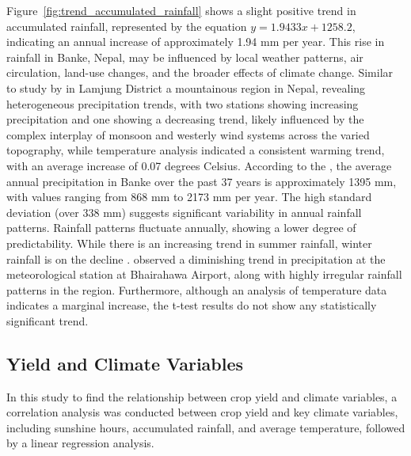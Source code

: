 Figure~\ref{fig:trend_accumulated_rainfall} shows a slight positive trend in accumulated rainfall, represented by the equation $y=1.9433x + 1258.2$, indicating an annual increase of approximately 1.94 mm per year. This rise in rainfall in Banke, Nepal, may be influenced by local weather patterns, air circulation, land-use changes, and the broader effects of climate change. Similar to study by \parencite{poudelRelationshipsClimateVariability2016} in Lamjung District a mountainous region in Nepal, revealing heterogeneous precipitation trends, with two stations showing increasing precipitation and one showing a decreasing trend, likely influenced by the complex interplay of monsoon and westerly wind systems across the varied topography, while temperature analysis indicated a consistent warming trend, with an average increase of 0.07 degrees Celsius.
According to the \parencite{regmiCROPYIELDRESPONSE2019}, the average annual precipitation in Banke over the past 37 years is approximately 1395 mm, with values ranging from 868 mm to 2173 mm per year. The high standard deviation (over 338 mm) suggests significant variability in annual rainfall patterns. 
Rainfall patterns fluctuate annually, showing a lower degree of predictability. While there is an increasing trend in summer rainfall, winter rainfall is on the decline \parencite{maharjanEffectClimateVariables2013}.
\parencite{manandharAdaptingCroppingSystems2011} observed a diminishing trend in precipitation at the meteorological station at Bhairahawa Airport, along with highly irregular rainfall patterns in the region. Furthermore, although an analysis of temperature data indicates a marginal increase, the t-test results do not show any statistically significant trend.

\subsection{Yield and Climate Variables}
In this study to find the relationship between crop yield and climate variables, a correlation analysis was conducted between crop yield and key climate variables, including sunshine hours, accumulated rainfall, and average temperature, followed by a linear regression analysis.

\begin{table}[htbp]
    \centering
    \caption{Correlation Table between Yield and Climate Variables}
\end{table}


